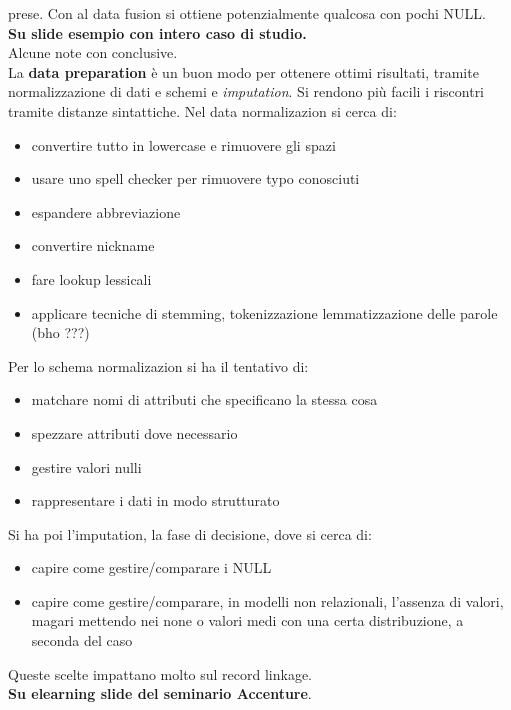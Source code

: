 \documentclass[a4paper,12pt, oneside]{book}
\begin{document}
prese. Con al data fusion si ottiene potenzialmente qualcosa con pochi NULL.\\
\textbf{Su slide esempio con intero caso di studio.}\\
Alcune note con conclusive.\\
La \textbf{data preparation} è un buon modo per ottenere ottimi risultati,
tramite normalizzazione di dati e schemi e \textit{imputation}. Si rendono più
facili i riscontri tramite distanze sintattiche. Nel data normalizazion si cerca
di:
\begin{itemize}
  \item convertire tutto in lowercase e rimuovere gli spazi
  \item usare uno spell checker per rimuovere typo conosciuti
  \item espandere abbreviazione
  \item convertire nickname
  \item fare lookup lessicali
  \item applicare tecniche di stemming, tokenizzazione lemmatizzazione delle
  parole (bho ???)
\end{itemize}
Per lo schema normalizazion si ha il tentativo di:
\begin{itemize}
  \item matchare nomi di attributi che specificano la stessa cosa
  \item spezzare attributi dove necessario
  \item gestire valori nulli
  \item rappresentare i dati in modo strutturato
\end{itemize}
Si ha poi l'imputation, la fase di decisione, dove si cerca di:
\begin{itemize}
  \item capire come gestire/comparare i NULL
  \item capire come gestire/comparare, in modelli non relazionali, l'assenza di
  valori, magari mettendo nei none o valori medi con una certa distribuzione, a
  seconda del caso
\end{itemize}
Queste scelte impattano molto sul record linkage.\\
\textbf{Su elearning slide del seminario Accenture}.
\end{document}
